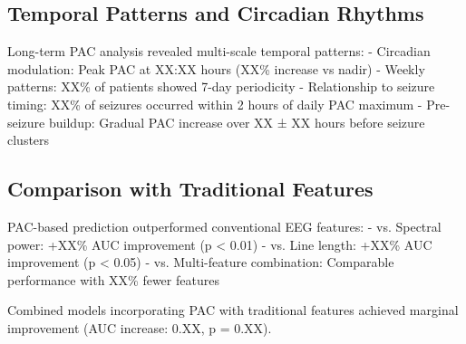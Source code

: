 \subsection{Temporal Patterns and Circadian Rhythms}

Long-term PAC analysis revealed multi-scale temporal patterns:
- Circadian modulation: Peak PAC at XX:XX hours (XX\% increase vs nadir)
- Weekly patterns: XX\% of patients showed 7-day periodicity
- Relationship to seizure timing: XX\% of seizures occurred within 2 hours of daily PAC maximum
- Pre-seizure buildup: Gradual PAC increase over XX ± XX hours before seizure clusters

\subsection{Comparison with Traditional Features}

PAC-based prediction outperformed conventional EEG features:
- vs. Spectral power: +XX\% AUC improvement (p < 0.01)
- vs. Line length: +XX\% AUC improvement (p < 0.05)
- vs. Multi-feature combination: Comparable performance with XX\% fewer features

Combined models incorporating PAC with traditional features achieved marginal improvement (AUC increase: 0.XX, p = 0.XX).

\label{sec:results}

\label{sec:results}

